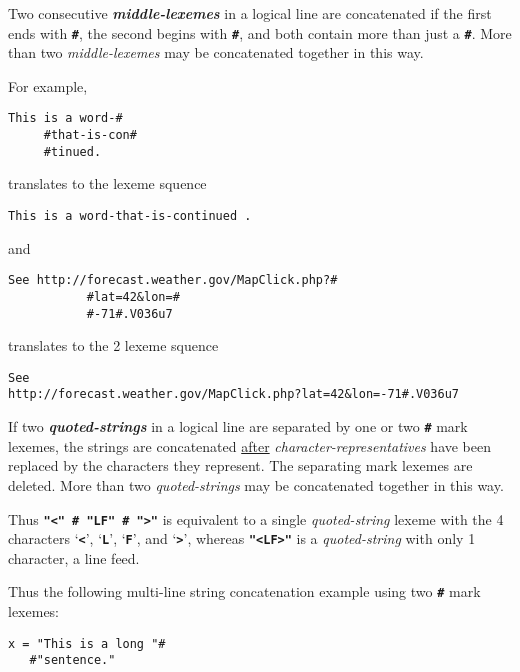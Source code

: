 \documentclass[12pt]{article}
\newcommand{\TT}[1]{{\tt \bfseries #1}}
\newcommand{\emkey}[1]{{\em \bfseries #1}}
\newenvironment{indpar}[1][0.3in]%
	{\begin{list}{}%
		     {\setlength{\itemsep}{0in}%
		      \setlength{\topsep}{0in}%
		      \setlength{\parsep}{1ex}%
		      \setlength{\labelwidth}{#1}%
		      \setlength{\leftmargin}{#1}%
		      \addtolength{\leftmargin}{\labelsep}}%
	 \item}%
	{\end{list}}
\begin{document}
\begin{enumerate}
\item\label{MIDDLE-LEXEME-CONCATENATION}
Two consecutive \emkey{middle-lexemes} in a logical line are concatenated
if the first ends with \TT{\#}, the second begins with \TT{\#}, and both
contain more than just a \TT{\#}.
More than two {\em middle-lexemes} may be concatenated
together in this way.

For example,

\begin{indpar}\begin{verbatim}
This is a word-#
     #that-is-con#
     #tinued.
\end{verbatim}\end{indpar}

translates to the lexeme squence

\begin{indpar}\begin{verbatim}
This is a word-that-is-continued .
\end{verbatim}\end{indpar}

and

\begin{indpar}\begin{verbatim}
See http://forecast.weather.gov/MapClick.php?#
           #lat=42&lon=#
           #-71#.V036u7
\end{verbatim}\end{indpar}

translates to the 2 lexeme squence

\begin{indpar}[0.1in]\small\begin{verbatim}
See
http://forecast.weather.gov/MapClick.php?lat=42&lon=-71#.V036u7
\end{verbatim}\end{indpar}

\item\label{QUOTED-STRING-CONCATENATION}
If two \emkey{quoted-strings} in a logical line are separated by
one or two \TT{\#} mark lexemes, the strings
are concatenated \underline{after} {\em character-represen\-ta\-tives}
have been replaced by the characters they represent.  The separating mark
lexemes are deleted.  More than two {\em quoted-strings} may be concatenated
together in this way.

Thus \TT{"<" \# "LF" \# ">"} is equivalent to a single {\em quoted-string}
lexeme with the 4 characters `\TT{<}', `\TT{L}', `\TT{F}', and
`\TT{>}', whereas \TT{"<LF>"} is a {\em quoted-string} with only
1 character, a line feed.

Thus the following multi-line string concatenation example using
two \TT{\#} mark lexemes:
\begin{indpar}\begin{verbatim}
x = "This is a long "#
   #"sentence."
\end{verbatim}\end{indpar}


\end{enumerate}
\end{document}

